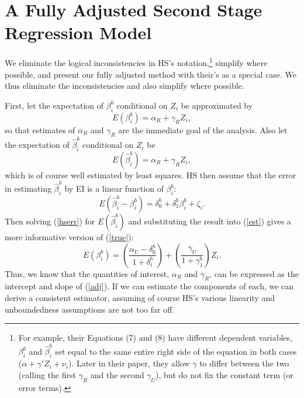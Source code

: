 \documentclass[11pt,titlepage]{article}
\begin{document}
\section{A Fully Adjusted Second Stage Regression Model}
\label{s:fulladj}

We eliminate the logical inconsistencies in HS's
notation,\footnote{For example, their Equations (7) and (8) have
  different dependent variables, $\beta_i^b$ and $\hat\beta_i^b$ set
  equal to the same entire right side of the equation in both cases
  ($\alpha+\gamma'Z_i+\nu_i$).  Later in their paper, they allow
  $\gamma$ to differ between the two (calling the first $\gamma_R$ and
  the second $\gamma_U$), but do not fix the constant term (or error
  terms).} simplify where possible, and present our fully adjusted
method with their's as a special case.  We thus eliminate the
inconsistencies and also simplify where possible.

First, let the expectation of $\beta_i^b$ conditional on $Z_i$ be
approximated by
\begin{equation}
  \label{true}
  E(\beta_i^b)=\alpha_R+\gamma_R Z_i,
\end{equation}
so that estimates of $\alpha_R$ and $\gamma_R$ are the immediate goal
of the analysis.  Also let the expectation of $\hat\beta_i^b$
conditional on $Z_i$ be
\begin{equation}
  \label{est}
  E(\hat\beta_i^b)=\alpha_R+\gamma_R Z_i,
\end{equation}
which is of course well estimated by least squares.  HS then assume
that the error in estimating $\hat\beta_i^b$ by EI is a linear
function of $\beta_i^b$:
\begin{equation}
  \label{hserr}
  E(\hat\beta_i^b - \beta_i^b)
  = \delta_0^b + \delta_1^b\beta_i^b + \zeta_i.
\end{equation}
Then solving (\ref{hserr}) for $E(\hat\beta_i^b)$ and substituting the
result into (\ref{est}) gives a more informative version of (\ref{true}):
\begin{equation}
  \label{adj}
  E(\beta_i^b) = \left(\frac{\alpha_U-\delta_0^b}{1+\delta_i^b}\right)
  + \left(\frac{\gamma_U}{1+\gamma_1^b}\right)Z_i.
\end{equation}
Thus, we know that the quantities of interest, $\alpha_R$ and
$\gamma_R$, can be expressed as the intercept and slope of
(\ref{adj}).  If we can estimate the components of each, we can derive
a consistent estimator, assuming of course HS's various linearity and
unboundedness assumptions are not too far off.
\end{document}
